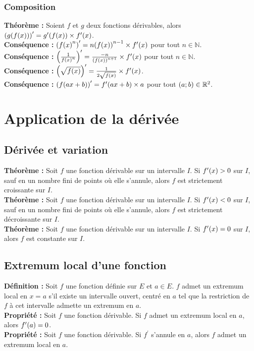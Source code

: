 \documentclass[a4paper,titlepage]{article}
\let\oldsection\section
\renewcommand\section{\clearpage\oldsection}
\let\oldleft\left
\renewcommand{\left}{\mathopen{}\mathclose\bgroup\oldleft}
\let\oldright\right
\renewcommand{\right}{\aftergroup\egroup\oldright}
\begin{document}
        \subsubsection{Composition}
            \textbf{Théorème :} Soient $f$ et $g$ deux fonctions dérivables, alors $\left(g\left(f\left(x\right)\right)\right)^{\prime}=g^{\prime}\left(f\left(x\right)\right)\times f^{\prime}\left(x\right)$.
            \\
            \textbf{Conséquence :} $\left(f\left(x\right)^{n}\right)^{\prime}=n\left(f\left(x\right)\right)^{n-1}\times f^{\prime}\left(x\right)$ pour tout $n\in\mathbb{N}$.
            \\
            \textbf{Conséquence :} $\left(\frac{1}{f\left(x\right)^{n}}\right)^{\prime}=\frac{-n}{\left(f\left(x\right)\right)^{n+1}}\times f^{\prime}\left(x\right)$ pour tout $n\in\mathbb{N}$.
            \\
            \textbf{Conséquence :} $\left(\sqrt{f\left(x\right)}\right)^{\prime}=\frac{1}{2\sqrt{f\left(x\right)}}\times f^{\prime}\left(x\right)$.
            \\
            \textbf{Conséquence :} $\left(f\left(ax+b\right)\right)^{\prime}=f^{\prime}\left(ax+b\right)\times a$ pour tout $\left(a;b\right)\in\mathbb{R}^{2}$.
\section{Application de la dérivée}
    \subsection{Dérivée et variation}
        \textbf{Théorème :} Soit $f$ une fonction dérivable sur un intervalle $I$. Si $f^{\prime}\left(x\right)>0$ sur $I$, sauf en un nombre fini de points où elle s’annule, alors $f$ est strictement croissante sur $I$.
        \\
        \textbf{Théorème :} Soit $f$ une fonction dérivable sur un intervalle $I$. Si $f^{\prime}\left(x\right)<0$ sur $I$, sauf en un nombre fini de points où elle s’annule, alors $f$ est strictement décroissante sur $I$.
        \\
        \textbf{Théorème :} Soit $f$ une fonction dérivable sur un intervalle $I$. Si $f^{\prime}\left(x\right)=0$ sur $I$, alors $f$ est constante sur $I$.
    \subsection{Extremum local d’une fonction}
        \textbf{Définition :} Soit $f$ une fonction définie sur $E$ et $a\in E$. $f$ admet un extremum local en $x=a$ s’il existe un intervalle ouvert, centré en $a$ tel que la restriction de $f$ à cet intervalle admette un extremum en $a$.
        \\
        \textbf{Propriété :} Soit $f$ une fonction dérivable. Si $f$ admet un extremum local en $a$, alors $f^{\prime}\left(a\right)=0$.
        \\
        \textbf{Propriété :} Soit $f$ une fonction dérivable. Si $f^{\prime}$ s’annule en $a$, alors $f$ admet un extremum local en $a$.
\end{document}
